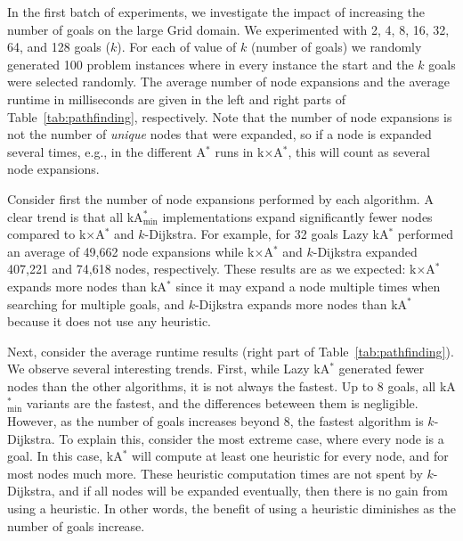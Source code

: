 \documentclass[smallextended]{svjour3}       %
\newcommand{\kD}{$k$-Dijkstra\xspace}
\newcommand{\astar}{A$^*$\xspace}
\newcommand{\kastar}{kA$^*$\xspace}
\newcommand{\kastarvar}[1]{\textup{kA}$^*_{#1}$\xspace}
\newcommand{\kastarmin}{\kastarvar{\min}}
\newcommand{\kastarmax}{\kastarvar{\max}}
\newcommand{\kxastar}{k$\times$A$^*$\xspace}
\begin{document}
In the first batch of experiments, we investigate the impact of increasing the number of goals on the large Grid domain.
We experimented with 2, 4, 8, 16, 32, 64, and 128 goals ($k$).
For each of value of $k$ (number of goals) we randomly generated 100 problem instances where in every instance the start and the $k$ goals were selected randomly. The average number of node expansions and the average runtime in milliseconds are given in the left and right parts of 
Table~\ref{tab:pathfinding}, respectively. Note that the number of node expansions is not the number of \emph{unique} nodes that were expanded, so if a node is expanded several times, e.g., in the different \astar runs in \kxastar, this will count as several node expansions. %






Consider first the number of node expansions performed by each algorithm. 
A clear trend is that all \kastarmin implementations expand significantly fewer nodes compared to \kxastar and \kD. For example, for 32 goals Lazy \kastar performed an average of 49,662 node expansions while \kxastar and \kD expanded 407,221 and 74,618 nodes, respectively. These results are as we expected: \kxastar expands more nodes than \kastar since it may expand a node multiple times when searching for multiple goals, and \kD expands more nodes than \kastar because it does not use any heuristic.


Next, consider the average runtime results (right part of Table~\ref{tab:pathfinding}). We observe several interesting trends.
First, while Lazy \kastar generated fewer nodes than the other algorithms, it is not always the fastest.
Up to 8 goals, all \kastarmin variants are the fastest, and the differences beteween them is negligible. However, as the number of goals increases beyond 8, the fastest algorithm is \kD.
To explain this, consider the most extreme case, where every node is a goal.
In this case, \kastar will compute at least one heuristic for every node, and for most nodes much more. These heuristic computation times are not spent by \kD, 
and if all nodes will be expanded eventually, then there is no gain from using a heuristic. In other words, the benefit of using a heuristic diminishes as the number of goals increase. 
\end{document}
